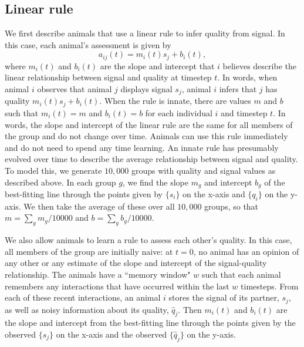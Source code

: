 \subsection*{Linear rule}
We first describe animals that use a linear rule to infer quality from signal. In this case, each animal's assessment is given by
\begin{equation*}
a_{ij}(t)=m_i(t)s_j+b_i(t),
\end{equation*}
where $m_i(t)$ and $b_i(t)$ are the slope and intercept that $i$ believes describe the linear relationship between signal and quality at timestep $t$. In words, when animal $i$ observes that animal $j$ displays signal $s_j$, animal $i$ infers that $j$ has quality $m_i(t)s_j+b_i(t)$. When the rule is innate, there are values $m$ and $b$ such that $m_i(t)=m$ and $b_i(t)=b$ for each individual $i$ and timestep $t$. In words, the slope and intercept of the linear rule are the same for all members of the group and do not change over time. Animals can use this rule immediately and do not need to spend any time learning.  An innate rule has presumably evolved over time to describe the average relationship between signal and quality. To model this, we generate $10,000$ groups with quality and signal values as described above. In each group $g$, we find the slope $m_{g}$ and intercept $b_{g}$ of the best-fitting line through the points given by $\{s_i\}$ on the x-axis and $\{q_i\}$ on the y-axis. We then take the average of these over all $10,000$ groups, so that $m=\sum_{g} m_{g}/10000$ and $b=\sum_{g}b_{g}/10000$. 

We also allow animals to learn a rule to assess each other's quality. In this case, all members of the group are initially naive: at $t=0$, no animal has an opinion of any other or any estimate of the slope and intercept of the signal-quality relationship. The animals have a ``memory window" $w$ such that each animal remembers any interactions that have occurred within the last $w$ timesteps. From each of these recent interactions, an animal $i$ stores the signal of its partner, $s_j$, as well as noisy information about its quality, $\hat{q}_j$.  Then $m_i(t)$ and $b_i(t)$ are the slope and intercept from the best-fitting line through the points given by the observed $\{s_j\}$ on the x-axis and the observed $\{\hat{q}_j\}$ on the y-axis.   

